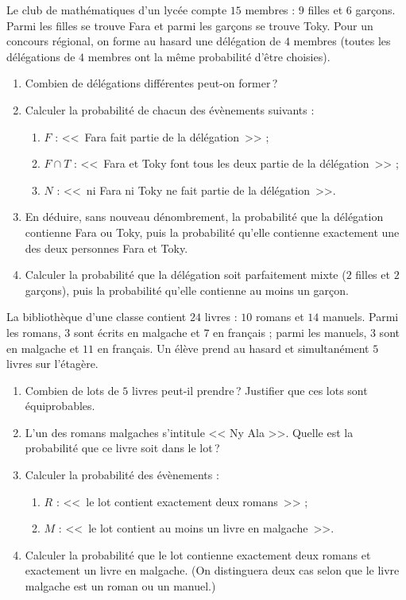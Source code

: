 \begin{exo}\label{exo:proba-10}
Le club de math\'ematiques d'un lyc\'ee compte $15$ membres : $9$ filles et $6$ gar\c{c}ons.
Parmi les filles se trouve Fara et parmi les gar\c{c}ons se trouve Toky.
Pour un concours r\'egional, on forme au hasard une d\'el\'egation de $4$ membres
(toutes les d\'el\'egations de $4$ membres ont la m\^eme probabilit\'e d'\^etre choisies).
\begin{enumerate}
\item Combien de d\'el\'egations diff\'erentes peut-on former\,?
\item Calculer la probabilit\'e de chacun des \'ev\`enements suivants :
      \begin{enumerate}
      \item $F$ : <<~Fara fait partie de la d\'el\'egation~>> ;
      \item $F\cap T$ : <<~Fara et Toky font tous les deux partie de la d\'el\'egation~>> ;
      \item $N$ : <<~ni Fara ni Toky ne fait partie de la d\'el\'egation~>>.
      \end{enumerate}
\item En d\'eduire, sans nouveau d\'enombrement, la probabilit\'e que la d\'el\'egation contienne Fara ou Toky,
      puis la probabilit\'e qu'elle contienne exactement une des deux personnes Fara et Toky.
\item Calculer la probabilit\'e que la d\'el\'egation soit parfaitement mixte ($2$ filles et $2$ gar\c{c}ons),
      puis la probabilit\'e qu'elle contienne au moins un gar\c{c}on.
\end{enumerate}
\end{exo}
%
\begin{exo}\label{exo:proba-11}
La biblioth\`eque d'une classe contient $24$ livres : $10$ romans et $14$ manuels.
Parmi les romans, $3$ sont \'ecrits en malgache et $7$ en fran\c{c}ais ;
parmi les manuels, $3$ sont en malgache et $11$ en fran\c{c}ais.
Un \'el\`eve prend au hasard et simultan\'ement $5$ livres sur l'\'etag\`ere.
\begin{enumerate}
\item Combien de lots de $5$ livres peut-il prendre\,? Justifier que ces lots sont \'equiprobables.
\item L'un des romans malgaches s'intitule << Ny Ala >>.
      Quelle est la probabilit\'e que ce livre soit dans le lot\,?
\item Calculer la probabilit\'e des \'ev\`enements :
      \begin{enumerate}
      \item $R$ : <<~le lot contient exactement deux romans~>> ;
      \item $M$ : <<~le lot contient au moins un livre en malgache~>>.
      \end{enumerate}
\item Calculer la probabilit\'e que le lot contienne exactement deux romans et exactement un livre en malgache.
      (On distinguera deux cas selon que le livre malgache est un roman ou un manuel.)
\end{enumerate}
\end{exo}
